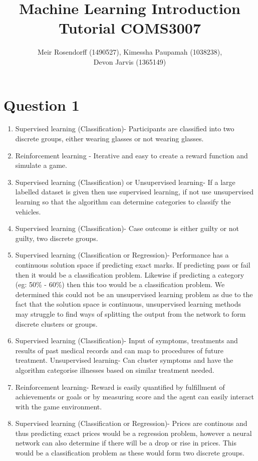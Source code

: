 \documentclass{article}
\title{Machine Learning Introduction Tutorial COMS3007}
\author{Meir Rosendorff (1490527), Kimessha Paupamah (1038238),\\ Devon Jarvis (1365149)}
\begin{document}
	\maketitle
	\section{Question 1}
		\begin{enumerate}[label=\alph*)]
			\item Supervised learning (Classification)-
			Participants are classified into two discrete groups, either wearing glasses 			or not wearing glasses.
			\item Reinforcement learning -
			Iterative and easy to create a reward function and simulate a game.
			\item Supervised learning (Classification) or Unsupervised learning-
			If a large labelled dataset is given then use supervised learning, if not 					use	unsupervised learning so that the algorithm can determine categories to 				classify the vehicles.
			\item Supervised learning (Classification)-
			Case outcome is either guilty or not guilty, two discrete groups.
			\item Supervised learning (Classification or Regression)-
			Performance has a continuous solution space if predicting exact marks. If 					predicting pass or fail then it would be a classification problem. Likewise 				if predicting a category (eg: 50\% - 60\%) then this too would be a 						classification problem. We determined this could not be an unsupervised 					learning problem as due to the fact that the solution space is 								continuous, unsupervised learning methods may struggle to find ways of 						splitting the output from the network to form discrete clusters or groups.
			\item Supervised learning (Classification)-
			Input of symptoms, treatments and results of past medical records and can 					map to procedures of future treatment. 
   			\newline Unsupervised learning-
			Can cluster symptoms and have the algorithm categorise illnesses based on 					similar treatment needed.
			\item Reinforcement learning-
			Reward is easily quantified by fulfillment of achievements or goals or by 					measuring score and the agent can easily interact with the game environment.
			\item Supervised learning (Classification or Regression)-
			Prices are continous and thus predicting exact prices would be a regression 				problem, however a neural network can also determine if there will be a drop 			or rise in prices. This would be a classification problem as these would 					form two discrete groups.
		\end{enumerate}
	
\end{document}
